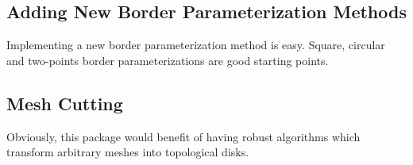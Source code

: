 \subsection{Adding New Border Parameterization Methods}

Implementing a new border parameterization method is easy.
Square, circular and two-points border parameterizations are good starting points.


\subsection{Mesh Cutting}

Obviously, this package would benefit of having robust algorithms
which transform arbitrary meshes into topological disks.

